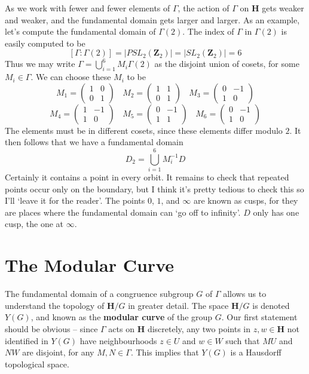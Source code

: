 As we work with fewer and fewer elements of $\Gamma$, the action of $\Gamma$ on $\mathbf{H}$ gets weaker and weaker, and the fundamental domain gets larger and larger. As an example, let's compute the fundamental domain of $\Gamma(2)$. The index of $\Gamma$ in $\Gamma(2)$ is easily computed to be
%
\[ [\Gamma: \Gamma(2)] = |PSL_2(\mathbf{Z}_2)| = |SL_2(\mathbf{Z}_2)| = 6 \]
%
Thus we may write $\Gamma = \bigcup_{i = 1}^6 M_i \Gamma(2)$ as the disjoint union of cosets, for some $M_i \in \Gamma$. We can choose these $M_i$ to be
%
\[ M_1 =  \begin{pmatrix} 1 & 0 \\ 0 & 1 \end{pmatrix}\ \ \ \ M_2 =  \begin{pmatrix} 1 & 1 \\ 0 & 1 \end{pmatrix}\ \ \ \ M_3 =  \begin{pmatrix} 0 & -1 \\ 1 & 0 \end{pmatrix} \]
\[ M_4 =  \begin{pmatrix} 1 & -1 \\ 1 & 0 \end{pmatrix}\ \ \ \ M_5 =  \begin{pmatrix} 0 & -1 \\ 1 & 1 \end{pmatrix}\ \ \ \ M_6 =  \begin{pmatrix} 0 & -1 \\ 1 & 0 \end{pmatrix} \]
%
The elements must be in different cosets, since these elements differ modulo $2$. It then follows that we have a fundamental domain
%
\[ D_2 = \bigcup_{i = 1}^6 M_i^{-1} D \]
%
Certainly it contains a point in every orbit. It remains to check that repeated points occur only on the boundary, but I think it's pretty tedious to check this so I'll `leave it for the reader'. The points $0$, $1$, and $\infty$ are known as cusps, for they are places where the fundamental domain can `go off to infinity'. $D$ only has one cusp, the one at $\infty$.

\section{The Modular Curve}

The fundamental domain of a congruence subgroup $G$ of $\Gamma$ allows us to understand the topology of $\mathbf{H}/G$ in greater detail. The space $\mathbf{H}/G$ is denoted $Y(G)$, and known as the {\bf modular curve} of the group $G$. Our first statement should be obvious -- since $\Gamma$ acts on $\mathbf{H}$ discretely, any two points in $z,w \in \mathbf{H}$ not identified in $Y(G)$ have neighbourhoods $z \in U$ and $w \in W$ such that $MU$ and $NW$ are disjoint, for any $M,N \in \Gamma$. This implies that $Y(G)$ is a Hausdorff topological space.

